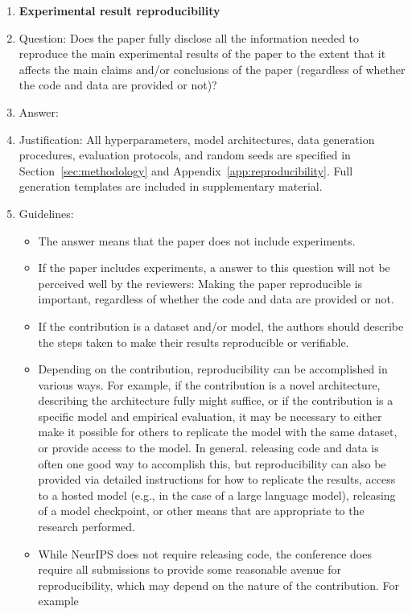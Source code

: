 \documentclass{article}
\begin{document}
\begin{enumerate}
    \item {\bf Experimental result reproducibility}
    \item[] Question: Does the paper fully disclose all the information needed to reproduce the main experimental results of the paper to the extent that it affects the main claims and/or conclusions of the paper (regardless of whether the code and data are provided or not)?
    \item[] Answer: \answerYes{}
    \item[] Justification: All hyperparameters, model architectures, data generation procedures, evaluation protocols, and random seeds are specified in Section~\ref{sec:methodology} and Appendix~\ref{app:reproducibility}. Full generation templates are included in supplementary material.
    \item[] Guidelines:
    \begin{itemize}
        \item The answer \answerNA{} means that the paper does not include experiments.
        \item If the paper includes experiments, a \answerNo{} answer to this question will not be perceived well by the reviewers: Making the paper reproducible is important, regardless of whether the code and data are provided or not.
        \item If the contribution is a dataset and\slash or model, the authors should describe the steps taken to make their results reproducible or verifiable.
        \item Depending on the contribution, reproducibility can be accomplished in various ways. For example, if the contribution is a novel architecture, describing the architecture fully might suffice, or if the contribution is a specific model and empirical evaluation, it may be necessary to either make it possible for others to replicate the model with the same dataset, or provide access to the model. In general. releasing code and data is often one good way to accomplish this, but reproducibility can also be provided via detailed instructions for how to replicate the results, access to a hosted model (e.g., in the case of a large language model), releasing of a model checkpoint, or other means that are appropriate to the research performed.
        \item While NeurIPS does not require releasing code, the conference does require all submissions to provide some reasonable avenue for reproducibility, which may depend on the nature of the contribution. For example

\end{itemize}
\end{enumerate}
\end{document}
